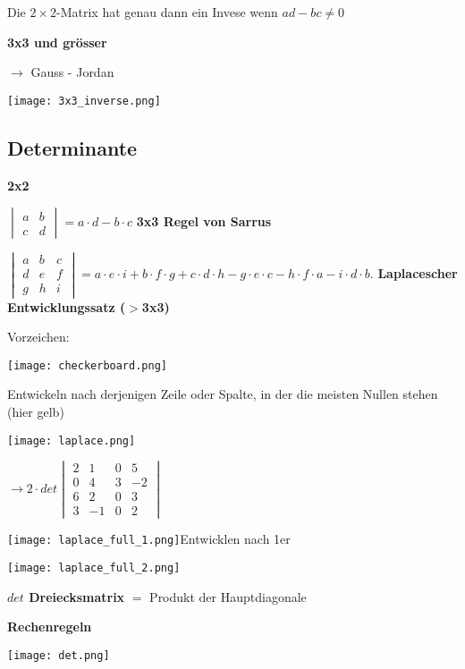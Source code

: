 \begin{multicols*}{3}
{Die $2\times2$-Matrix hat genau dann ein Invese wenn $ad-bc \neq 0$}

\textbf{3x3 und grösser}

{$\rightarrow$ Gauss - Jordan}

 \texttt{[image: 3x3\_inverse.png]} 
\WhiteSpace

\subsection{Determinante}
{\textbf{2x2}}

$\begin{vmatrix}
a & b\\
c & d
\end{vmatrix} = a\cdot d - b\cdot c $
\WhiteSpace
\textbf{3x3 Regel von Sarrus}

$\begin{vmatrix} a & b & c \\ d & e & f \\ g & h &i \end{vmatrix} = a \cdot e \cdot i + b \cdot f \cdot g + c \cdot d \cdot h - g \cdot e \cdot c - h \cdot f \cdot a - i \cdot d \cdot b.$
\WhiteSpace
\textbf{Laplacescher Entwicklungssatz ($ >$3x3)}

{\begin{multicols}{2}
Vorzeichen:

\columnbreak
{ \texttt{[image: checkerboard.png]} }
 
\end{multicols}}

{{Entwickeln nach derjenigen Zeile oder Spalte, in
der die meisten Nullen stehen (hier gelb)}}
{\begin{multicols}{2}
 {\texttt{[image: laplace.png]}}
\columnbreak

{  $ \rightarrow  2 \cdot det \begin{vmatrix} 2 & 1 & 0 & 5 \\ 0 & 4 & 3 & -2 \\ 6 & 2 &0 & 3 \\ 3 & -1 &0 & 2 \end{vmatrix} $}
\end{multicols}}

{\texttt{[image: laplace\_full\_1.png]}Entwicklen nach 1er}  

{\texttt{[image: laplace\_full\_2.png]}}


\textbf{$det$ Dreiecksmatrix}
$ = $ Produkt der Hauptdiagonale
\WhiteSpace

\textbf{Rechenregeln}

{\texttt{[image: det.png]}}


 
\mbox{}
	
\end{multicols*} 


